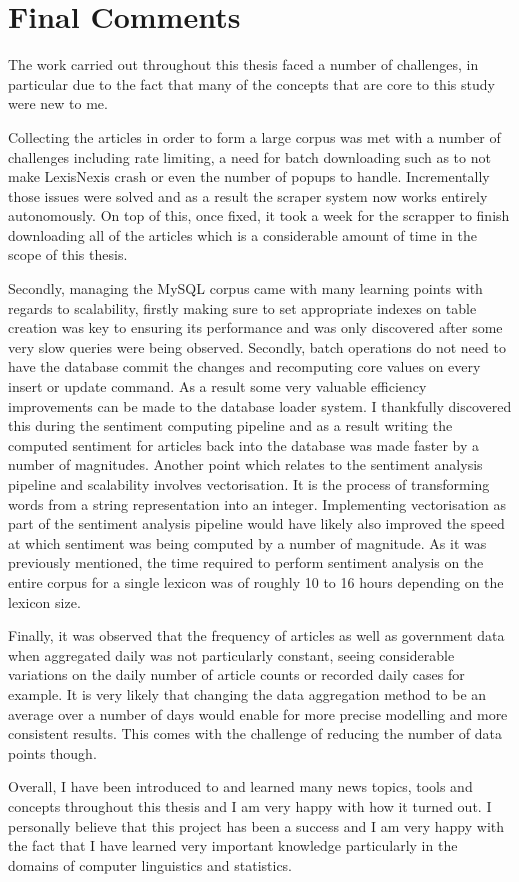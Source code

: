 \section{Final Comments}

The work carried out throughout this thesis faced a number of challenges, in particular due to the fact that many of the concepts that are core to this study were new to me.

Collecting the articles in order to form a large corpus was met with a number of challenges including rate limiting, a need for batch downloading such as to not make LexisNexis crash or even the number of popups to handle. Incrementally those issues were solved and as a result the scraper system now works entirely autonomously. On top of this, once fixed, it took a week for the scrapper to finish downloading all of the articles which is a considerable amount of time in the scope of this thesis.

Secondly, managing the MySQL corpus came with many learning points with regards to scalability, firstly making sure to set appropriate indexes on table creation was key to ensuring its performance and was only discovered after some very slow queries were being observed. Secondly, batch operations do not need to have the database commit the changes and recomputing core values on every insert or update command. As a result some very valuable efficiency improvements can be made to the database loader system. I thankfully discovered this during the sentiment computing pipeline and as a result writing the computed sentiment for articles back into the database was made faster by a number of magnitudes. Another point which relates to the sentiment analysis pipeline and scalability involves vectorisation. It is the process of transforming words from a string representation into an integer. Implementing vectorisation as part of the sentiment analysis pipeline would have likely also improved the speed at which sentiment was being computed by a number of magnitude. As it was previously mentioned, the time required to perform sentiment analysis on the entire corpus for a single lexicon was of roughly 10 to 16 hours depending on the lexicon size.

Finally, it was observed that the frequency of articles as well as government data when aggregated daily was not particularly constant, seeing considerable variations on the daily number of article counts or recorded daily cases for example. It is very likely that changing the data aggregation method to be an average over a number of days would enable for more precise modelling and more consistent results. This comes with the challenge of reducing the number of data points though.

Overall, I have been introduced to and learned many news topics, tools and concepts throughout this thesis and I am very happy with how it turned out. I personally believe that this project has been a success and I am very happy with the fact that I have learned very important knowledge particularly in the domains of computer linguistics and statistics.
